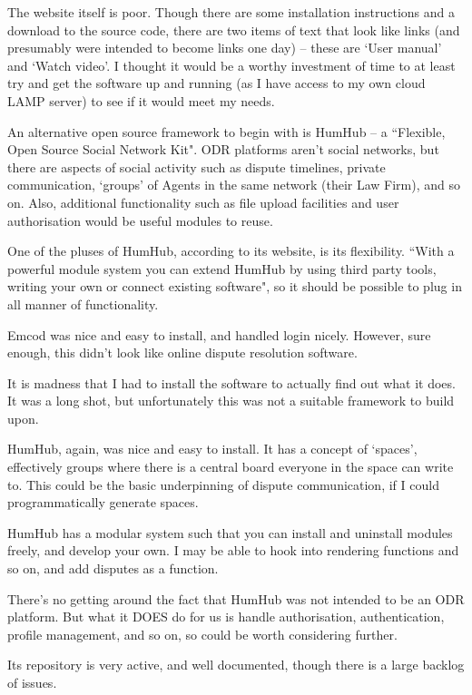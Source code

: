 The website itself is poor. Though there are some installation instructions and a download to the source code, there are two items of text that look like links (and presumably were intended to become links one day) – these are `User manual' and `Watch video'. I thought it would be a worthy investment of time to at least try and get the software up and running (as I have access to my own cloud LAMP server) to see if it would meet my needs.

An alternative open source framework to begin with is HumHub – a ``Flexible, Open Source Social Network Kit". ODR platforms aren't social networks, but there are aspects of social activity such as dispute timelines, private communication, `groups' of Agents in the same network (their Law Firm), and so on. Also, additional functionality such as file upload facilities and user authorisation would be useful modules to reuse.

One of the pluses of HumHub, according to its website, is its flexibility. ``With a powerful module system you can extend HumHub by using third party tools, writing your own or connect existing software", so it should be possible to plug in all manner of functionality.

Emcod was nice and easy to install, and handled login nicely. However, sure enough, this didn't look like online dispute resolution software.

It is madness that I had to install the software to actually find out what it does. It was a long shot, but unfortunately this was not a suitable framework to build upon.

HumHub, again, was nice and easy to install. It has a concept of `spaces', effectively groups where there is a central board everyone in the space can write to. This could be the basic underpinning of dispute communication, if I could programmatically generate spaces.

HumHub has a modular system such that you can install and uninstall modules freely, and develop your own. I may be able to hook into rendering functions and so on, and add disputes as a function.

There’s no getting around the fact that HumHub was not intended to be an ODR platform. But what it DOES do for us is handle authorisation, authentication, profile management, and so on, so could be worth considering further.

Its repository is very active, and well documented, though there is a large backlog of issues.

